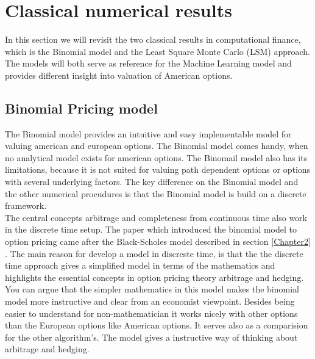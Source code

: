 
\chapter{Classical numerical results} %

\label{Chapter3} %



In this section we will revisit the two classical results in computational finance, which is the Binomial model and the Least Square Monte Carlo (LSM) approach. The models will both serve as reference for the Machine Learning model and provides different insight into valuation of American options.


\section{Binomial Pricing model}
The Binomial model provides an intuitive and easy implementable model for valuing american and european options. The Binomial model comes handy, when no analytical model exists for american options. The Binomail model also has its limitations, because it is not suited for valuing path dependent options or options with several underlying factors. The key difference on the Binomial model and the other numerical procudures is that the Binomial model is build on a discrete framework. \\

The central concepts arbitrage and completeness from continuous time also work in the discrete time setup. The paper \parencite{binomial-Paper} which introduced the binomial model to option pricing came after the Black-Scholes model described in section \ref{Chapter2} \parencite{B-S-Paper}. The main reason for develop a model in discreste time, is that the the discrete time approach gives a simplified model in terms of the mathematics and highlights the essential concepts in option pricing theory arbitrage and hedging. You can argue that the simpler mathematics in this model makes the binomial model more instructive and clear from an economist viewpoint. Besides being easier to understand for non-mathematician it works nicely with other options than the European options like American options. It serves also as a comparision for the other algorithm's. The model gives a instructive way of thinking about arbitrage and hedging. \\

